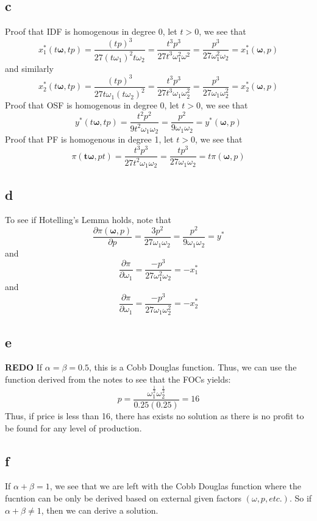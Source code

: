\documentclass[11pt]{article}
\begin{document}
\subsection*{c}
Proof that IDF is homogenous in degree 0, let $t >0$, we see that 
\[
x_1^*(t\mathbf{\omega}, tp) =\frac{(tp)^3}{27(t\omega_1)^2t\omega_2} = \frac{t^3 p^3}{27t^3\omega_1^2\omega^2} = \frac{p^3}{27\omega_1^2\omega_2} = x_1^*(\mathbf{\omega}, p)
\]
and similarly
\[
x_2^*(t\mathbf{\omega}, tp) = \frac{(tp)^3}{27t\omega_1(t\omega_2)^2} = \frac{t^3p^3}{27t^3\omega_1\omega_2^2} = \frac{p^3}{27\omega_1\omega_2^2} = x_2^*(\mathbf{\omega}, p)
\]
Proof that OSF is homogenous in degree 0, let $t > 0$, we see that 
\[
y^*(t\mathbf{\omega}, tp) = \frac{t^2p^2}{9t^2\omega_1\omega_2} = \frac{p^2}{9\omega_1\omega_2} = y^*(\mathbf{\omega}, p)
\]
Proof that PF is homogenous in degree 1, let $t > 0$, we see that 
\[
\pi(\mathbf{t\omega}, pt) = \frac{t^3p^3}{27t^2\omega_1\omega_2} = \frac{tp^3}{27\omega_1\omega_2} = t\pi(\mathbf{\omega}, p)
\]
\subsection*{d}
To see if Hotelling's Lemma holds, note that 
\[
\frac{\partial \pi(\mathbf{\omega}, p)}{\partial p} = \frac{3p^2}{27\omega_1\omega_2} = \frac{p^2}{9\omega_1\omega_2} = y^*
\]
and 
\[
\frac{\partial \pi}{\partial \omega_1} = \frac{-p^3}{27\omega_1^2\omega_2} = -x^*_1
\]
and 
\[
    \frac{\partial \pi}{\partial \omega_1} = \frac{-p^3}{27 \omega_1\omega_2^2} = -x^*_2
\]
\subsection*{e}
\textbf{REDO}
If $\alpha = \beta = 0.5$, this is a Cobb Douglas function. Thus, we can use the function derived from the notes to see that the FOCs yields:
\[
p = \frac{\omega_1^\frac{1}{2}\omega_2^\frac{1}{2}}{0.25(0.25)} = 16
\]
Thus, if price is less than 16, there has exists no solution as there is no profit to be found for any level of production. 
\subsection*{f}
If $\alpha + \beta = 1$, we see that we are left with the Cobb Douglas function where the fucntion can be only be derived based on external given factors $(\omega, p,  etc.)$. So if $\alpha + \beta \neq 1$, then we can derive a solution. 
\end{document}
